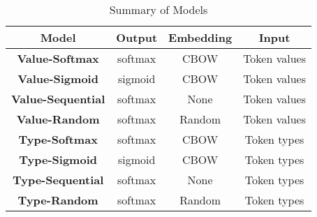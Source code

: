 \begin{table}
\begin{center}
\begingroup
\setlength{\tabcolsep}{6pt} %
\renewcommand{\arraystretch}{1.5} %
\begin{tabular}{|| c | c | c | c ||} 
    \hline
    Model & Output & Embedding & Input \\ 
    \hline\hline
    \textbf{Value-Softmax} & softmax & CBOW & Token values \\
    \hline
    \textbf{Value-Sigmoid} &  sigmoid & CBOW & Token values \\ 
    \hline
    \textbf{Value-Sequential} & softmax & None & Token values \\
    \hline
    \textbf{Value-Random} & softmax & Random & Token values \\
    \hline
    \textbf{Type-Softmax} & softmax & CBOW & Token types \\
    \hline
    \textbf{Type-Sigmoid} & sigmoid & CBOW & Token types \\
    \hline
    \textbf{Type-Sequential} & softmax & None & Token types \\
    \hline
    \textbf{Type-Random} & softmax & Random & Token types \\
    \hline
\end{tabular}
\endgroup
\caption{\label{model-sum}Summary of Models}
\end{center}
\end{table}
